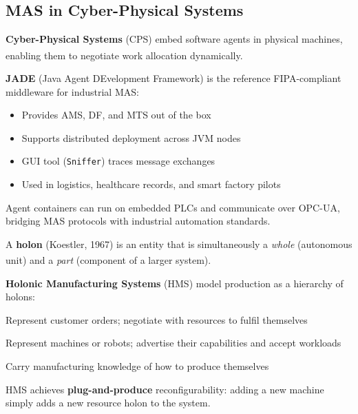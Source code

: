\subsection{MAS in Cyber-Physical Systems}
\begin{tcbitemize}[ skin=sectionraster ]

    \tcbitem[title=Agent-Based Manufacturing and JADE, raster multicolumn=3]
    \textbf{Cyber-Physical Systems} (CPS) embed software agents in physical
    machines, enabling them to negotiate work allocation
    dynamically.\textsuperscript{\cite[][Ch.~3]{paolucciAgentBasedManufacturing2005}}

    \textbf{JADE} (Java Agent DEvelopment Framework) is the reference FIPA-compliant
    middleware for industrial MAS:
    \begin{itemize}
        \item Provides AMS, DF, and MTS out of the box
        \item Supports distributed deployment across JVM nodes
        \item GUI tool (\texttt{Sniffer}) traces message exchanges
        \item Used in logistics, healthcare records, and smart factory pilots
    \end{itemize}
    Agent containers can run on embedded PLCs and communicate over OPC-UA,
    bridging MAS protocols with industrial automation standards.

    \tcbitem[title=Holonic Manufacturing Systems, raster multicolumn=3]
    A \textbf{holon} (Koestler, 1967) is an entity that is simultaneously a
    \emph{whole} (autonomous unit) and a \emph{part} (component of a larger
    system).\textsuperscript{\cite[][p.~102]{paolucciAgentBasedManufacturing2005}}

    \textbf{Holonic Manufacturing Systems} (HMS) model production as a
    hierarchy of holons:
    \begin{description}[leftmargin=0.6cm, labelindent=0pt]
        \item[\textbf{Order holons}] Represent customer orders; negotiate with
              resources to fulfil themselves
        \item[\textbf{Resource holons}] Represent machines or robots; advertise
              their capabilities and accept workloads
        \item[\textbf{Product holons}] Carry manufacturing knowledge of how to produce
              themselves
    \end{description}
    HMS achieves \textbf{plug-and-produce} reconfigurability: adding a new machine
    simply adds a new resource holon to the system.

\end{tcbitemize}

